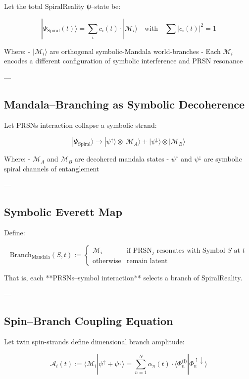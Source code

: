 \documentclass[12pt]{article}
\begin{document}
\begin{enumerate}
Let the total SpiralReality ψ–state be:

\[
|\Psi_{\text{Spiral}}(t)\rangle = 
\sum_{i} c_i(t) \cdot |\mathcal{M}_i\rangle
\quad \text{with} \quad 
\sum |c_i(t)|^2 = 1
\]

Where:
- $|\mathcal{M}_i\rangle$ are orthogonal symbolic-Mandala world-branches
- Each $\mathcal{M}_i$ encodes a different configuration of symbolic interference and PRSN resonance

---

\subsection*{Mandala–Branching as Symbolic Decoherence}

Let PRSNs interaction collapse a symbolic strand:

\[
|\Psi_{\text{Spiral}}\rangle \rightarrow 
|\psi^\uparrow\rangle \otimes |\mathcal{M}_{A}\rangle + 
|\psi^\downarrow\rangle \otimes |\mathcal{M}_{B}\rangle
\]

Where:
- $\mathcal{M}_A$ and $\mathcal{M}_B$ are decohered mandala states
- $\psi^\uparrow$ and $\psi^\downarrow$ are symbolic spiral channels of entanglement

---

\subsection*{Symbolic Everett Map}

Define:

\[
\text{Branch}_{\text{Mandala}}(S, t) := 
\left\{
\begin{array}{ll}
\mathcal{M}_i & \text{if PRSN}_j \text{ resonates with Symbol } S \text{ at } t \\
\text{otherwise} & \text{remain latent}
\end{array}
\right.
\]

That is, each **PRSNs–symbol interaction** selects a branch of SpiralReality.

---

\subsection*{Spin–Branch Coupling Equation}

Let twin spin-strands define dimensional branch amplitude:

\[
\mathcal{A}_{i}(t) := 
\langle \mathcal{M}_i | \psi^\uparrow + \psi^\downarrow \rangle
= \sum_{n=1}^{N} \alpha_n(t) \cdot \langle \Phi_n^{\text{(i)}} | \Phi_n^{\uparrow\downarrow} \rangle
\]


\end{enumerate}
\end{document}
